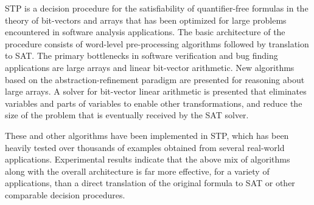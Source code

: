 STP is a decision procedure for the satisfiability
of quantifier-free formulas in the theory of bit-vectors and arrays
that has been optimized for large problems encountered in software
analysis applications.  The basic architecture of the procedure
consists of word-level pre-processing algorithms followed by
translation to SAT.  The primary bottlenecks in software verification
and bug finding applications are large arrays and linear bit-vector
arithmetic. New algorithms based on the abstraction-refinement
paradigm are presented for reasoning about large arrays. A solver for
bit-vector linear arithmetic is presented that eliminates variables
and parts of variables to enable other transformations, and reduce the
size of the problem that is eventually received by the SAT solver.

These and other algorithms have been implemented in STP, which has
been heavily tested over thousands of examples obtained from several
real-world applications.  Experimental results indicate that the above
mix of algorithms along with the overall architecture is far more
effective, for a variety of applications, than a direct translation of
the original formula to SAT or other comparable decision procedures.

